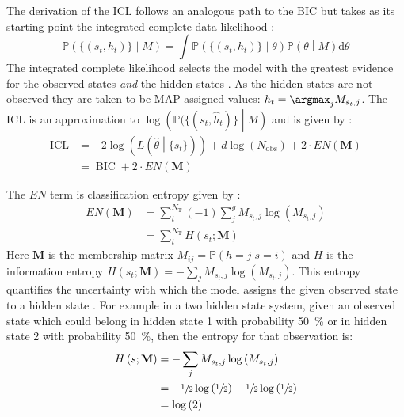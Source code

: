 The derivation of the ICL follows an analogous path to the BIC but takes as its starting point the integrated complete-data likelihood \cite{biernackiAssessingMixtureModel2000a}: 
\begin{equation}\label{eqn:class_lik_int}
    \mathbb{P}\left(\{(s_t, h_t)\}\middle | M \right) = \int \mathbb{P}\left(\{(s_{t}, h_{t})\}\middle |\theta \right)\mathbb{P}\left(\theta\middle | M\right) \mathrm{d}\theta
\end{equation}
The integrated complete likelihood selects the model with the greatest evidence for the observed states \emph{and} the hidden states \cite{biernackiAssessingMixtureModel2000a}. As the hidden states are not observed they are taken to be MAP assigned values: $h_t = \argmax_{j} M_{s_{t}, j}$. The ICL is an approximation to $\log{\left(\mathbb{P}(\{(s_t, \hat{h}_t)\}\middle | M \right)}$ and is given by \cite{biernackiAssessingMixtureModel2000a}:
\begin{equation}\label{eqn:icl}
\begin{split}
        \operatorname{ICL} &= -2\log{\left(L\left(\hat{\theta}\middle|\{s_t\}\right)\right)} + d\log{\left(N_{\mathrm{obs}}\right)} +2\cdot EN\left(\mathbf{M}\right)     \\
        & = \operatorname{BIC} + 2\cdot EN\left(\mathbf{M}\right)
\end{split}
\end{equation}

The $EN$ term  is classification entropy given by \cite{biernackiAssessingMixtureModel2000a}:
\begin{equation}\label{eqn:class_entropy}
\begin{split}
     EN\left(\mathbf{M}\right) & = \sum_{t}^{N_{\mathrm{T}}}(-1)\sum_{j}^{g} M_{s_{t}, j}\log{\left(M_{s_{t}, j}\right)}  \\ 
     & =\sum_{t}^{N_{\mathrm{T}}} H\left(s_{t}; \mathbf{M}\right)
\end{split}
\end{equation}
Here $\mathbf{M}$ is the membership matrix $M_{ij}= \mathbb{P}(h=j|s=i)$ and $H$ is the information entropy $H\left(s_{t};\mathbf{M}\right) = -\sum_{j} M_{s_{t}, j}\log{\left(M_{s_t, j}\right)}$. This entropy quantifies the uncertainty with which the model assigns the given observed state to a hidden state \cite{mackay2003information}. For example in a two hidden state system, given an observed state which could belong in hidden state 1 with probability \SI{50}{\percent} or in hidden state 2 with probability \SI{50}{\percent}, then the entropy for that observation is:
\begin{equation}
\begin{split}
    H\left(s; \mathbf{M}\right) & =  -\sum_{j} M_{s_{t}, j}\log{\left(M_{s_t, j}\right)} \\
    & = -\sfrac{1}{2}\log{\left(\sfrac{1}{2}\right)} - \sfrac{1}{2}\log{\left(\sfrac{1}{2}\right)} \\
    & = \log{\left(2\right)}
\end{split}
\end{equation}
 
